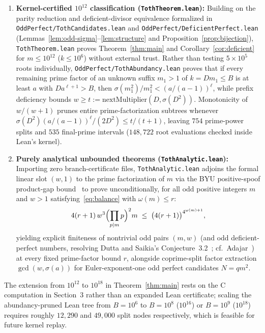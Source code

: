\documentclass[11pt]{amsart}
\theoremstyle{definition}
\theoremstyle{remark}
\begin{document}
\begin{enumerate}
  \item \textbf{Kernel-certified $10^{12}$ classification (\texttt{TothTheorem.lean}):} Building on the parity reduction and deficient-divisor equivalence formalized in \texttt{OddPerfect/TothCandidates.lean} and \texttt{OddPerfect/DeficientPerfect.lean} (Lemmas~\ref{lem:odd-sigma}--\ref{lem:structure} and Proposition~\ref{prop:bijection}), \texttt{TothTheorem.lean} proves Theorem~\ref{thm:main} and Corollary~\ref{cor:deficient} for $m \le 10^{12}$ ($k \le 10^6$) without external trust. Rather than testing $5 \times 10^5$ roots individually, \texttt{OddPerfect/TothAbundancy.lean} proves that if every remaining prime factor of an unknown suffix $m_1 > 1$ of $k = D m_1 \le B$ is at least $a$ with $D a^{\ell + 1} > B$, then $\sigma(m_1^2)/m_1^2 < (a/(a-1))^\ell$, while prefix deficiency bounds $w \ge t := \mathrm{nextMultiplier}(D, \sigma(D^2))$. Monotonicity of $w/(w+1)$ prunes entire prime-factorization subtrees whenever $\sigma(D^2)(a/(a-1))^\ell / (2D^2) \le t/(t+1)$, leaving $754$ prime-power splits and $535$ final-prime intervals ($148{,}722$ root evaluations checked inside Lean's kernel).
  \item \textbf{Purely analytical unbounded theorems (\texttt{TothAnalytic.lean}):} Importing zero branch-certificate files, \texttt{TothAnalytic.lean} adjoins the formal linear slot $(w, 1)$ to the prime factorization of $m$ via the BYU positive-spoof product-gap bound~\cite{BYU2022} to prove unconditionally, for all odd positive integers $m$ and $w > 1$ satisfying~\eqref{eq:balance} with $\omega(m) \le r$:
  \[
    4(r + 1)\, w^3 \Bigl(\prod_{p \mid m} p\Bigr)^2 m \;\le\; \bigl(4(r + 1)\bigr)^{4^{\omega(m) + 1}},
  \]
  yielding explicit finiteness of nontrivial odd pairs $(m, w)$ (and odd deficient-perfect numbers, resolving Dutta and Saikia's Conjecture~3.2~\cite{DuttaSaikia2020}; cf.\ Adajar~\cite{Adajar2019}) at every fixed prime-factor bound $r$, alongside coprime-split factor extraction $\gcd(w, \sigma(a))$ for Euler-exponent-one odd perfect candidates $N = q m^2$.
\end{enumerate}

The extension from $10^{12}$ to $10^{18}$ in Theorem~\ref{thm:main} rests on the C computation in Section~3 rather than an expanded Lean certificate; scaling the abundancy-pruned Lean tree from $B = 10^6$ to $B = 10^8$ ($10^{16}$) or $B = 10^9$ ($10^{18}$) requires roughly $12{,}290$ and $49{,}000$ split nodes respectively, which is feasible for future kernel replay.
\end{document}
